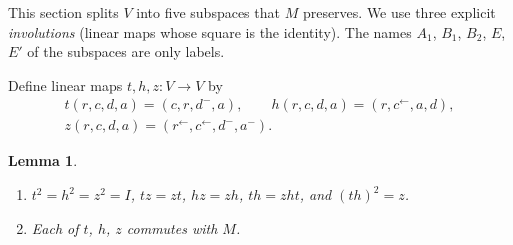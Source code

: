 \documentclass[11pt]{amsart}
\theoremstyle{plain}
\newtheorem{lemma}{Lemma}
\theoremstyle{definition}
\theoremstyle{remark}
\numberwithin{equation}{section}
\newcommand{\rev}[1]{#1^{\leftarrow}}  %
\newcommand{\refl}[1]{#1^{-}}          %
\begin{document}
This section splits \(V\) into five subspaces that \(M\) preserves. We use three
explicit \emph{involutions} (linear maps whose square is the identity). The names
\(A_1\), \(B_1\), \(B_2\), \(E\), \(E'\) of the subspaces are only labels.

Define linear maps \(t,h,z\colon V\to V\) by
\begin{equation}\label{eq:ops}
\begin{gathered}
t(r,c,d,a)=(c,r,\refl{d},a),\qquad h(r,c,d,a)=(r,\rev{c},a,d),\\
z(r,c,d,a)=(\rev{r},\rev{c},\refl{d},\refl{a}).
\end{gathered}
\end{equation}

\begin{lemma}\label{lem:sym}
\begin{enumerate}
\item[(a)] \(t^2=h^2=z^2=I\), \(tz=zt\), \(hz=zh\), \(th=zht\), and \((th)^2=z\).
\item[(b)] Each of \(t\), \(h\), \(z\) commutes with \(M\).
\end{enumerate}
\end{lemma}
\end{document}
